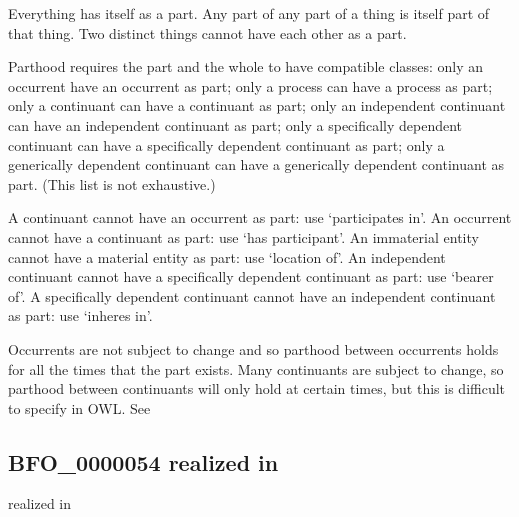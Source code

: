 \documentclass[letterpaper,10pt,english]{sphinxmanual}
\begin{document}
\begin{sphinxShadowBox}

\sphinxAtStartPar
Everything has itself as a part. Any part of any part of a thing is itself part of that thing. Two distinct things cannot have each other as a part.

\sphinxAtStartPar
Parthood requires the part and the whole to have compatible classes: only an occurrent have an occurrent as part; only a process can have a process as part; only a continuant can have a continuant as part; only an independent continuant can have an independent continuant as part; only a specifically dependent continuant can have a specifically dependent continuant as part; only a generically dependent continuant can have a generically dependent continuant as part. (This list is not exhaustive.)

\sphinxAtStartPar
A continuant cannot have an occurrent as part: use ‘participates in’. An occurrent cannot have a continuant as part: use ‘has participant’. An immaterial entity cannot have a material entity as part: use ‘location of’. An independent continuant cannot have a specifically dependent continuant as part: use ‘bearer of’. A specifically dependent continuant cannot have an independent continuant as part: use ‘inheres in’.

\sphinxAtStartPar
Occurrents are not subject to change and so parthood between occurrents holds for all the times that the part exists. Many continuants are subject to change, so parthood between continuants will only hold at certain times, but this is difficult to specify in OWL. See 
\end{sphinxShadowBox}

\begin{sphinxShadowBox}

\sphinxAtStartPar
{}
\end{sphinxShadowBox}
\begin{quote}

\ignorespaces \end{quote}


\subsection{BFO\_0000054 \sphinxhyphen{} realized in}
\label{\detokenize{doc-BFO_0000054:bfo-0000054-realized-in}}\label{\detokenize{doc-BFO_0000054:index-0}}\label{\detokenize{doc-BFO_0000054::doc}}
\begin{sphinxShadowBox}

\sphinxAtStartPar
realized in
\end{sphinxShadowBox}
\end{document}
